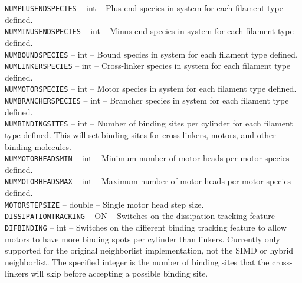 \documentclass[11pt, oneside]{article}   	%
\begin{document}
     \noindent\texttt{NUMPLUSENDSPECIES} -- int -- Plus end species in system for each filament type defined. \\
   
     \noindent\texttt{NUMMINUSENDSPECIES} -- int -- Minus end species in system for each filament type defined. \\
   
     \noindent\texttt{NUMBOUNDSPECIES} -- int -- Bound species in system for each filament type defined. \\
   
      \noindent\texttt{NUMLINKERSPECIES} -- int -- Cross-linker species in system for each filament type defined.  \\
   
       \noindent\texttt{NUMMOTORSPECIES} -- int -- Motor species in system for each filament type defined. \\
   
       \noindent\texttt{NUMBRANCHERSPECIES} -- int -- Brancher species in system for each filament type defined. \\
   
       \noindent\texttt{NUMBINDINGSITES} -- int -- Number of binding sites per cylinder for each filament type defined. 
       This will set binding sites for cross-linkers, motors, and other binding molecules. \\
   
       \noindent\texttt{NUMMOTORHEADSMIN} -- int -- Minimum number of motor heads per motor species defined. \\
     
       \noindent\texttt{NUMMOTORHEADSMAX} -- int -- Maximum number of motor heads per motor species defined. \\
     
       \noindent\texttt{MOTORSTEPSIZE} -- double -- Single motor head step size. \\
       
       \noindent \texttt{DISSIPATIONTRACKING} -- ON -- Switches on the dissipation tracking feature \\
       
       \noindent \texttt{DIFBINDING} -- int -- Switches on the different binding tracking feature to allow motors to have more binding spots per cylinder than linkers.  Currently only supported for the original neighborlist implementation, not the SIMD or hybrid neighborlist.  The specified integer is the number of binding sites that the cross-linkers will skip before accepting a possible binding site. \\
       
\end{document}
